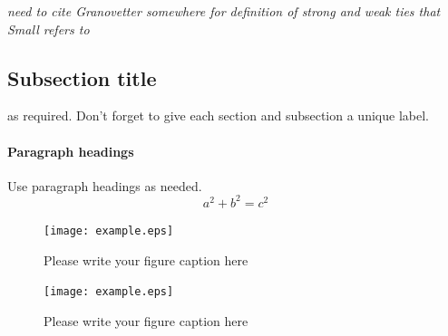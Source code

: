 \emph{need to cite Granovetter somewhere for definition of strong and weak ties that Small refers to}




%
%




\clearpage



\subsection{Subsection title}
\label{sec:2}
as required. Don't forget to give each section
and subsection a unique label.
\paragraph{Paragraph headings} Use paragraph headings as needed.
\begin{equation}
a^2+b^2=c^2
\end{equation}

\begin{figure}
  \texttt{[image: example.eps]}
\caption{Please write your figure caption here}
\label{fig:1}       %
\end{figure}
%
\begin{figure}
  \texttt{[image: example.eps]}
\caption{Please write your figure caption here}
\label{fig:2}       %
\end{figure}
%


